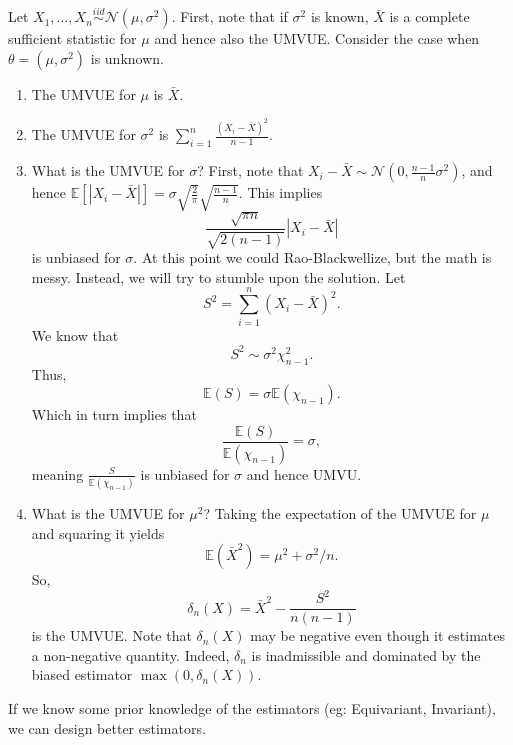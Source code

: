 \begin{exam}
Let $X_1, \ldots, X_n \stackrel{iid}{\sim} \mathcal{N}(\mu, \sigma^2)$. First, note that if $\sigma^2$ is known, $\bar{X}$ is a complete sufficient statistic for $\mu$ and hence also the UMVUE. Consider the case when $\theta = (\mu, \sigma^2)$ is unknown.
\begin{enumerate}
    \item[(a)] The UMVUE for $\mu$ is $\bar{X}$.
    \item[(b)] The UMVUE for $\sigma^2$ is $\sum_{i=1}^{n} \frac{(X_i - \bar{X})^2}{n-1}$.
    \item[(c)] What is the UMVUE for $\sigma$? First, note that $X_i - \bar{X} \sim \mathcal{N}(0, \frac{n-1}{n} \sigma^2)$, and hence $\mathbb{E}[|X_i - \bar{X}|] = \sigma \sqrt{\frac{2}{\pi}} \sqrt{\frac{n-1}{n}}$. This implies
    \[
    \frac{\sqrt{\pi n}}{\sqrt{2(n-1)}} |X_i - \bar{X}|
    \]
    is unbiased for $\sigma$. At this point we could Rao-Blackwellize, but the math is messy. Instead, we will try to stumble upon the solution. Let
    \[
    S^2 = \sum_{i=1}^{n} (X_i - \bar{X})^2.
    \]
    We know that
    \[
    S^2 \sim \sigma^2 \chi^2_{n-1}.
    \]
    Thus,
    \[
    \mathbb{E}(S) = \sigma \mathbb{E}(\chi_{n-1}).
    \]
    Which in turn implies that
    \[
    \frac{\mathbb{E}(S)}{\mathbb{E}(\chi_{n-1})} = \sigma,
    \]
    meaning $\frac{S}{\mathbb{E}(\chi_{n-1})}$ is unbiased for $\sigma$ and hence UMVU.
    \item[(d)] What is the UMVUE for $\mu^2$? Taking the expectation of the UMVUE for $\mu$ and squaring it yields
    \[
    \mathbb{E}(\bar{X}^2) = \mu^2 + \sigma^2 / n.
    \]
    So,
    \[
    \delta_n(X) = \bar{X}^2 - \frac{S^2}{n(n-1)}
    \]
    is the UMVUE. Note that $\delta_n(X)$ may be negative even though it estimates a non-negative quantity. Indeed, $\delta_n$ is inadmissible and dominated by the biased estimator $\max(0, \delta_n(X))$.
\end{enumerate}
\end{exam}
If we know some prior knowledge of the estimators (eg: Equivariant, Invariant), we can design better estimators.

